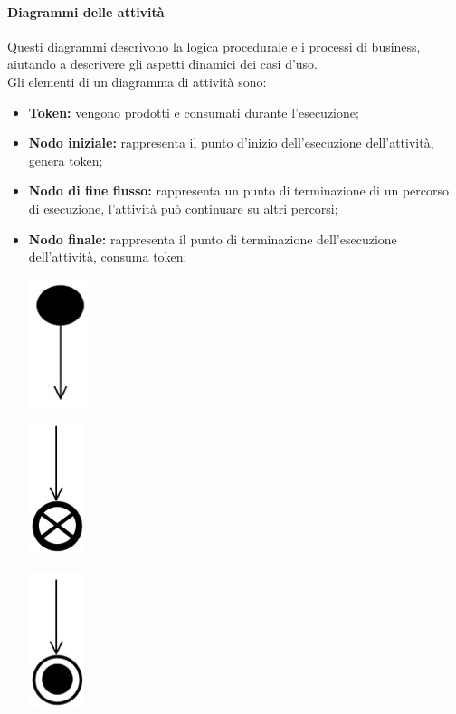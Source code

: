 \paragraph*{Diagrammi delle attività}
Questi diagrammi descrivono la logica procedurale e i processi di business, aiutando a descrivere gli aspetti dinamici dei casi d'uso. \\
Gli elementi di un diagramma di attività sono:
\begin{itemize}
	\item \textbf{Token:} vengono prodotti e consumati durante l'esecuzione;
	\item \textbf{Nodo iniziale:} rappresenta il punto d'inizio dell'esecuzione dell'attività, genera token;
	\item \textbf{Nodo di fine flusso:} rappresenta un punto di terminazione di un percorso di esecuzione, l'attività può continuare su altri percorsi;
	\item \textbf{Nodo finale:} rappresenta il punto di terminazione dell'esecuzione dell'attività, consuma token;
	\begin{center}
		\begin{minipage}{0.3\textwidth}
			\centering
			\includegraphics[scale=0.2]{Immagini/UML/NodoIniziale}
		\end{minipage}
		\begin{minipage}{0.3\textwidth}
			\centering
			\includegraphics[scale=0.2]{Immagini/UML/NodoFineFlusso}
		\end{minipage}
		\begin{minipage}{0.3\textwidth}
			\centering
			\includegraphics[scale=0.19]{Immagini/UML/NodoFinale}

\end{minipage}
\end{center}
\end{itemize}
